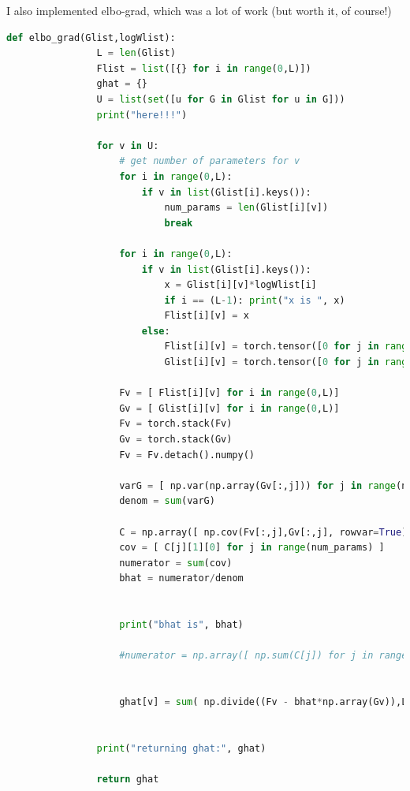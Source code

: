 \documentclass[12pt]{article}%
\theoremstyle{definition}
\begin{document}
		\newpage
		
		I also implemented elbo-grad, which was a lot of work (but worth it, of course!)
		
		\begin{lstlisting}[language=Python]
		def elbo_grad(Glist,logWlist): 
		        L = len(Glist)
		        Flist = list([{} for i in range(0,L)])
		        ghat = {}
		        U = list(set([u for G in Glist for u in G]))
		        print("here!!!")
		
		        for v in U:
		            # get number of parameters for v
		            for i in range(0,L):
		                if v in list(Glist[i].keys()):
		                    num_params = len(Glist[i][v])
		                    break
		
		            for i in range(0,L):
		                if v in list(Glist[i].keys()):
		                    x = Glist[i][v]*logWlist[i]
		                    if i == (L-1): print("x is ", x)
		                    Flist[i][v] = x 
		                else:
		                    Flist[i][v] = torch.tensor([0 for j in range(num_params)])
		                    Glist[i][v] = torch.tensor([0 for j in range(num_params)])
		
		            Fv = [ Flist[i][v] for i in range(0,L)]
		            Gv = [ Glist[i][v] for i in range(0,L)]
		            Fv = torch.stack(Fv)
		            Gv = torch.stack(Gv)
		            Fv = Fv.detach().numpy()
		
		            varG = [ np.var(np.array(Gv[:,j])) for j in range(num_params) ]
		            denom = sum(varG)
		            
		            C = np.array([ np.cov(Fv[:,j],Gv[:,j], rowvar=True) for j in range(num_params) ])
		            cov = [ C[j][1][0] for j in range(num_params) ]
		            numerator = sum(cov)
		            bhat = numerator/denom
		
		
		            print("bhat is", bhat)
		            
		            #numerator = np.array([ np.sum(C[j]) for j in range(num_params) ])
		
		            
		            ghat[v] = sum( np.divide((Fv - bhat*np.array(Gv)),L) )
		
		
		        print("returning ghat:", ghat)
		
		        return ghat
		\end{lstlisting}
		
		\newpage
		
\end{document}
